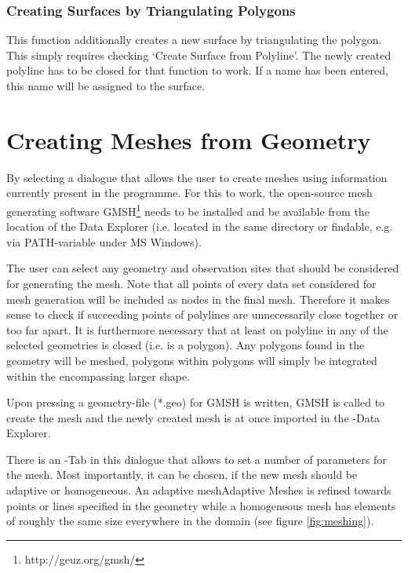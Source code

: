 \subsubsection{Creating Surfaces by Triangulating Polygons}
This function additionally creates a new surface by triangulating the polygon. This simply requires checking `Create Surface from Polyline'. The newly created polyline has to be closed for that function to work. If a name has been entered, this name will be assigned to the surface.

\section{Creating Meshes from Geometry}
\label{meshcreation}

By selecting  a dialogue that allows the user to create meshes using information currently present in the programme. For this to work, the open-source mesh generating software GMSH\footnote{http://geuz.org/gmsh/} needs to be installed and be available from the location of the Data Explorer (i.e. located in the same directory or findable, e.g. via PATH-variable under MS Windows).

The user can select any geometry and observation sites that should be considered for generating the mesh. Note that all points of every data set considered for mesh generation will be included as nodes in the final mesh. Therefore it makes sense to check if succeeding points of polylines are unnecessarily close together or too far apart. It is furthermore necessary that at least on polyline in any of the selected geometries is closed (i.e. is a polygon). Any polygons found in the geometry will be meshed, polygons within polygons will simply be integrated within the encompassing larger shape.

Upon pressing  a geometry-file (*.geo) for GMSH is written, GMSH is called to create the mesh and the newly created mesh is at once imported in the \ogs-Data Explorer.

There is an -Tab in this dialogue that allows to set a number of parameters for the mesh. Most importantly, it can be chosen, if the new mesh should be adaptive or homogeneous. An adaptive mesh{Adaptive Meshes} is refined towards points or lines specified in the geometry while a homogeneous mesh has elements of roughly the same size everywhere in the domain (see figure \ref{fig:meshing}).

